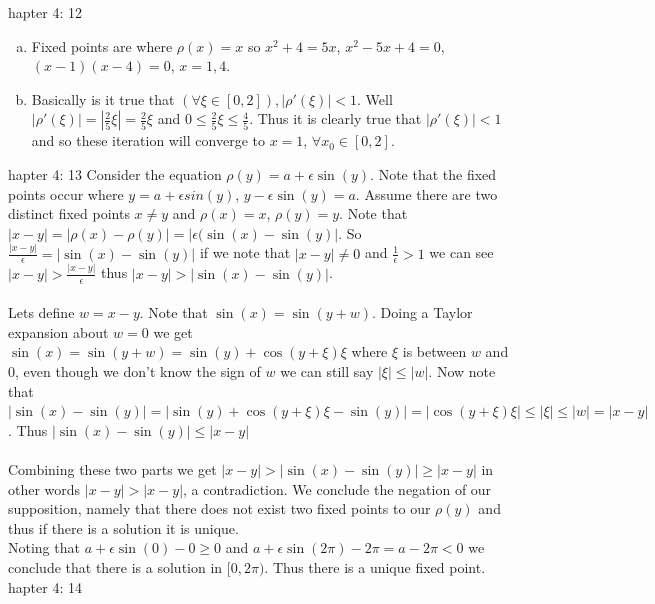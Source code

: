 \documentclass[12pt]{article}
\makeatletter
\theoremstyle{homework}
\newenvironment{exercise}[1]
{\def\@currentlabel{#1}\exercisecore}
{\endexercisecore}
\makeatother
\begin{document}
\begin{exercise}

Chapter 4: 12
\end{exercise}
\begin{enumerate}[(a)]
\item
Fixed points are where $\rho(x)=x$ so $x^2+4=5x$, $x^2-5x+4=0$, $(x-1)(x-4)=0$, $x=1,4$.
\item
Basically is it true that $(\forall\xi\in [0,2]), |\rho'(\xi)|<1$.  Well $|\rho'(\xi)|=|\frac{2}{5}\xi|=\frac{2}{5}\xi$ and $0 \leq \frac{2}{5}\xi \leq \frac{4}{5}$.  Thus it is clearly true that $|\rho'(\xi)|<1$ and so these iteration will converge to $x=1$, $\forall x_0\in [0,2]$.
\end{enumerate}
\begin{exercise}

Chapter 4: 13
\end{exercise}
Consider the equation $\rho(y)=a+\epsilon \sin(y)$.  Note that the fixed points occur where $y=a+\epsilon sin(y)$, $y-\epsilon \sin(y)=a$.  Assume there are two distinct fixed points $x\neq y$ and $\rho(x)=x$, $\rho(y)=y$.  Note that $|x-y|=|\rho(x)-\rho(y)|=|\epsilon(\sin(x)-\sin(y)|$.  So $\frac{|x-y|}{\epsilon}=|\sin(x)-\sin(y)|$ if we note that $|x-y|\neq 0$ and $\frac{1}{\epsilon}>1$ we can see $|x-y|>\frac{|x-y|}{\epsilon}$ thus $|x-y|>|\sin(x)-\sin(y)|$.\\\\
Lets define $w=x-y$.  Note that $\sin(x)=\sin(y+w)$.  Doing a Taylor expansion about $w=0$ we get $\sin(x)=\sin(y+w)=\sin(y)+\cos(y+\xi)\xi$ where $\xi$ is between $w$ and 0, even though we don't know the sign of $w$ we can still say $|\xi|\leq |w|$.  Now note that $|\sin(x)-\sin(y)|=|\sin(y)+\cos(y+\xi)\xi-\sin(y)|=|\cos(y+\xi)\xi|\leq |\xi|\leq |w|=|x-y|$.  Thus $|\sin(x)-\sin(y)|\leq |x-y|$\\\\
Combining these two parts we get $|x-y|>|\sin(x)-\sin(y)|\geq |x-y|$ in other words $|x-y|>|x-y|$, a contradiction.  We conclude the negation of our supposition, namely that there does not exist two fixed points to our $\rho(y)$ and thus if there is a solution it is unique.\\
Noting that $a+\epsilon \sin(0)-0\geq 0$ and $a+\epsilon \sin(2 \pi)-2\pi=a-2\pi<0$ we conclude that there is a solution in $[0,2\pi)$.  Thus there is a unique fixed point.
\newpage
\begin{exercise}

Chapter 4: 14
\end{exercise}
\end{document}
